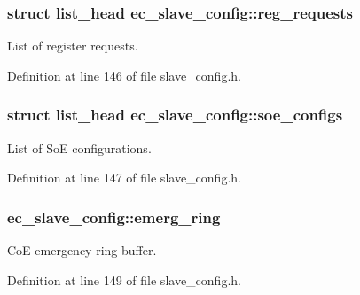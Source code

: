\subsubsection[{reg\-\_\-requests}]{\setlength{\rightskip}{0pt plus 5cm}struct list\-\_\-head ec\-\_\-slave\-\_\-config\-::reg\-\_\-requests}\label{structec__slave__config_a391b64268ec07ce78e7aa50c9641e436}


List of register requests. 



Definition at line 146 of file slave\-\_\-config.\-h.

\subsubsection[{soe\-\_\-configs}]{\setlength{\rightskip}{0pt plus 5cm}struct list\-\_\-head ec\-\_\-slave\-\_\-config\-::soe\-\_\-configs}\label{structec__slave__config_a9bfab1eba98284fcaa21079ea1700188}


List of So\-E configurations. 



Definition at line 147 of file slave\-\_\-config.\-h.

\subsubsection[{emerg\-\_\-ring}]{ ec\-\_\-slave\-\_\-config\-::emerg\-\_\-ring}\label{structec__slave__config_a8a43523dca6d68508d858813f3d497a9}


Co\-E emergency ring buffer. 



Definition at line 149 of file slave\-\_\-config.\-h.


